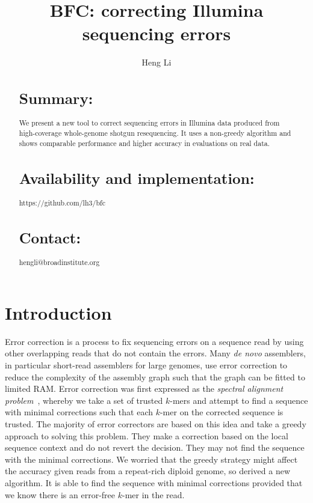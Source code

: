 \documentclass{bioinfo}
\begin{document}

\title[Error Correction for Illumina Data]{BFC: correcting Illumina sequencing errors}

\author[Li]{Heng Li}

\address{Broad Institute, 75 Ames Street, Cambridge, MA 02142, USA}

\maketitle

\begin{abstract}
\section{Summary:} We present a new tool to correct sequencing errors in
Illumina data produced from high-coverage whole-genome shotgun resequencing. It
uses a non-greedy algorithm and shows comparable performance and higher
accuracy in evaluations on real data.

\section{Availability and implementation:} https://github.com/lh3/bfc

\section{Contact:} hengli@broadinstitute.org
\end{abstract}

\section{Introduction}

Error correction is a process to fix sequencing errors on a sequence read
by using other overlapping reads that do not contain the errors. Many \emph{de
novo} assemblers, in particular short-read assemblers for large genomes, use
error correction to reduce the complexity of the assembly graph such that the
graph can be fitted to limited RAM. Error correction was first expressed
as the \emph{spectral alignment problem}~\citep{Pevzner:2001vn}, whereby we take
a set of trusted $k$-mers and attempt to find a sequence with minimal
corrections such that each $k$-mer on the corrected sequence is trusted.
The majority of error correctors are based on this idea and take a greedy
approach to solving this problem.  They make a correction based on the local
sequence context and do not revert the decision. They may not find the sequence
with the minimal corrections. We worried that the greedy strategy might affect
the accuracy given reads from a repeat-rich diploid genome, so derived a new
algorithm. It is able to find the sequence with minimal corrections provided
that we know there is an error-free $k$-mer in the read.
\end{document}
